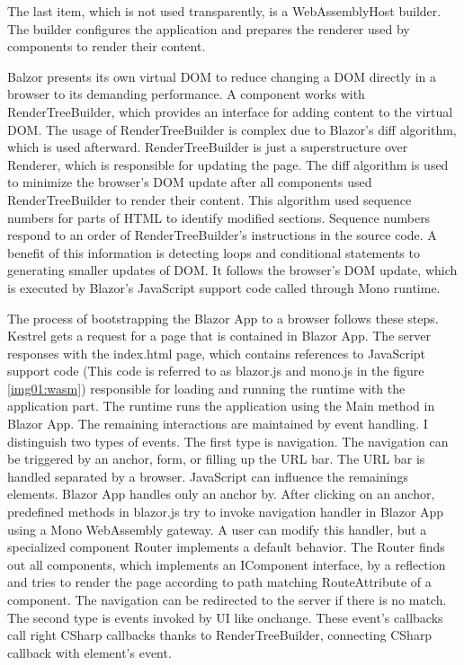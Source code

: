 The last item, which is not used transparently, is a WebAssemblyHost builder.
The builder configures the application and prepares the renderer used by components to render their content.

Balzor presents its own virtual DOM to reduce changing a DOM directly in a browser to its demanding performance.
A component works with RenderTreeBuilder, which provides an interface for adding content to the virtual DOM.
The usage of RenderTreeBuilder is complex due to Blazor's diff algorithm, which is used afterward.
RenderTreeBuilder is just a superstructure over Renderer, which is responsible for updating the page.
The diff algorithm is used to minimize the browser's DOM  update after all components used RenderTreeBuilder to render their content.
This algorithm used sequence numbers for parts of HTML to identify modified sections.
Sequence numbers respond to an order of RenderTreeBuilder's instructions in the source code.
A benefit of this information is detecting loops and conditional statements to generating smaller updates of DOM.  
It follows the browser's DOM update, which is executed by Blazor's JavaScript support code called through Mono runtime.

The process of bootstrapping the Blazor App to a browser follows these steps. 
Kestrel gets a request for a page that is contained in Blazor App. 
The server responses with the index.html page, which contains references to JavaScript support code (This code is referred to as blazor.js and mono.js in the figure \ref{img01:wasm}) responsible for loading and running the runtime with the application part.
The runtime runs the application using the Main method in Blazor App.
The remaining interactions are maintained by event handling.
I distinguish two types of events.
The first type is navigation.
The navigation \cite{14} can be triggered by an anchor, form, or filling up the URL bar.
The URL bar is handled separated by a browser.
JavaScript can influence the remainings elements.
Blazor App handles only an anchor by.
After clicking on an anchor, predefined methods in blazor.js try to invoke navigation handler in Blazor App using a Mono WebAssembly gateway.
A user can modify this handler, but a specialized component Router implements a default behavior.
The Router finds out all components, which implements an IComponent interface, by a reflection and tries to render the page according to path matching RouteAttribute of a component.
The navigation can be redirected to the server if there is no match.
The second type is events invoked by UI like onchange. These event's callbacks call right CSharp callbacks thanks to RenderTreeBuilder, connecting CSharp callback with element's event.

